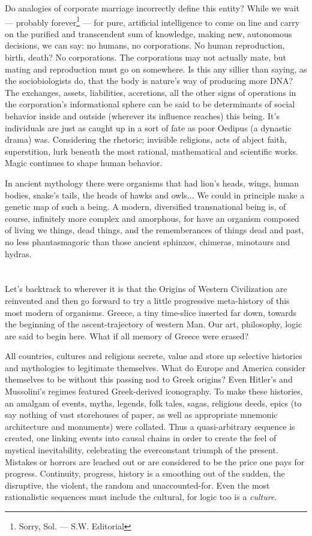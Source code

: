 \documentclass[11pt,twoside,draft]{memoir}
\begin{document}
Do analogies of corporate marriage incorrectly define this entity? While we wait --- 
probably forever\footnote{Sorry, Sol. --- S.W. Editorial} --- for pure, artificial intelligence to come on line and carry on the purified and transcendent sum of knowledge, making
new, autonomous decisions, we can say: no humans, no corporations.
No human reproduction, birth, death? No corporations. The corporations may not
actually mate, but mating and reproduction must go on somewhere. Is this any sillier
than saying, as the sociobiologists do, that the body is nature's way of producing more
DNA? The exchanges, assets, liabilities, accretions, all the other signs of operations
in the corporation's informational sphere
can be said to be determinants of social
behavior inside and outside (wherever its
influence reaches) this being. It's individuals are just as caught up in a sort of fate as
poor Oedipus (a dynastic drama) was. Considering
the rhetoric; invisible religions,
acts of abject faith, superstition, lurk beneath
the most rational, mathematical and scientific works. Magic continues to shape human
behavior.

In ancient mythology there were organisms that had lion's heads, wings, human
bodies, snake's tails, the heads of hawks and
owls... We could in principle make a genetic map
of such a being. A modern, diversified transnational being is, of course,
infinitely more complex and amorphous, for
have an organism composed of living we
things, dead things, and the rememberances
of things dead and past, no less phantasmagoric than those ancient sphinxes, chimeras,
minotaurs and hydras.

\chapter{}

Let's backtrack to wherever it is that
the Origins of Western Civilization are reinvented and then go forward to try a little
progressive meta-history of this most modern of organisms. Greece, a tiny time-slice
inserted far down, towards the beginning of
the ascent-trajectory of western Man. Our
art, philosophy, logic are said to begin here.
What if all memory of Greece were erased?

All countries, cultures and religions secrete, value and store up selective histories
and mythologies to legitimate themselves.
What do Europe and America consider themselves to be without this passing nod to Greek
origins? Even Hitler's and Mussolini's regimes featured Greek-derived iconography.
To make these histories, an amalgam of
events, myths, legends, folk tales, sagas,
religious deeds, epics (to say nothing of vast
storehouses of paper, as well as appropriate
mnemonic architecture and monuments)
were collated. Thus a quasi-arbitrary sequence is created, one linking events into
causal chains in order to create the feel of
mystical inevitability, celebrating the everconstant triumph of the present. Mistakes or
horrors are leached out or are considered to
be the price one pays for progress. Continuity, progress, history is a smoothing out
of the sudden, the disruptive, the violent, the
random and unaccounted-for. Even the most
rationalistic sequences must include the cultural, for logic too is a \emph{culture}.
\end{document}
